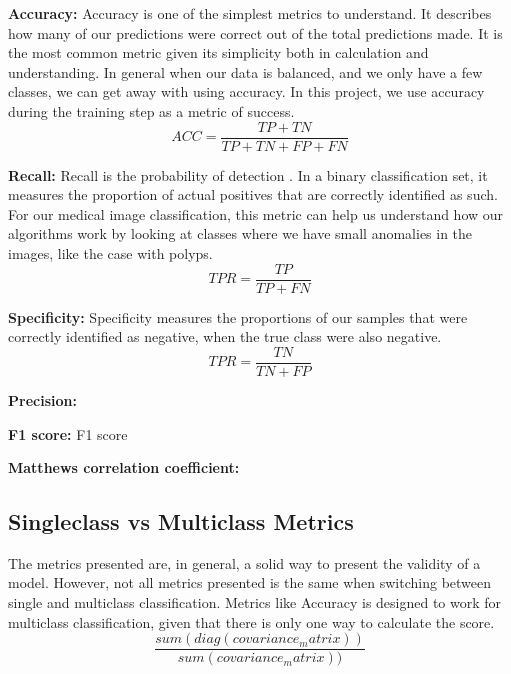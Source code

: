 \vspace{5px}
\textbf{Accuracy:}  Accuracy is one of the simplest metrics to understand. It describes how many of our predictions were correct out of the total predictions made. It is the most common metric given its simplicity both in calculation and understanding. 
In general when our data is balanced, and we only have a few classes, we can get away with using accuracy. 
In this project, we use accuracy during the training step as a metric of success.
 \begin{equation}
ACC=\frac{TP+TN}{TP+TN+FP+FN}
\end{equation}

\vspace{5px}
\textbf{Recall:}  Recall is the probability of detection . In a binary classification set, it measures the proportion of actual positives that are correctly identified as such. 
For our medical image classification, this metric can help us understand how our algorithms work by looking at classes where we have small anomalies in the images, like the case with polyps.
\begin{equation}
TPR=\frac{TP}{TP+FN}
\end{equation}

\vspace{5px}
\textbf{Specificity:} Specificity measures the proportions of our samples that were correctly identified as negative, when the true class were also negative. 
\begin{equation}
TPR=\frac{TN}{TN+FP}
\end{equation}

\vspace{5px}
\textbf{Precision:}



\vspace{5px}
\textbf{F1 score:}
F1 score

\vspace{5px}
\textbf{Matthews correlation coefficient:}

\subsection{Singleclass vs Multiclass Metrics}

The metrics presented are, in general, a solid way to present the validity of a model. However, not all metrics presented is the same when switching between single and multiclass classification.  Metrics like Accuracy is designed to work for multiclass classification, given that there is only one way to calculate the score.
\begin{equation}
\frac{sum(diag(covariance_matrix))}{sum(covariance_matrix))}
\end{equation}

